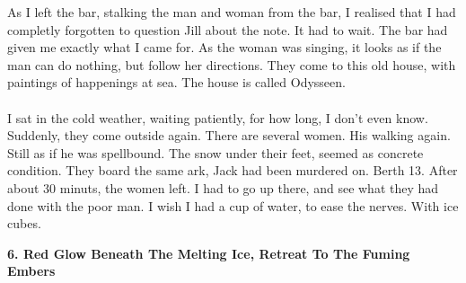 \documentclass[]{article}
\begin{document}
	As I left the bar, stalking the man and woman from the bar, I realised that I had completly forgotten to question Jill about the note. It had to wait. The bar had given me exactly what I came for. As the woman was singing, it looks as if the man can do nothing, but follow her directions. They come to this old house, with paintings of happenings at sea. The house is called Odysseen.
	\\ \\
	I sat in the cold weather, waiting patiently, for how long, I don't even know. Suddenly, they come outside again. There are several women. His walking again. Still as if he was spellbound. The snow under their feet, seemed as concrete condition. They board the same ark, Jack had been murdered on. Berth 13. After about 30 minuts, the women left. I had to go up there, and see what they had done with the poor man. I wish I had a cup of water, to ease the nerves. With ice cubes.
	
	\newpage
	
	\begin{center}
		\large\textbf{6. Red Glow Beneath The Melting Ice, \newline Retreat To The Fuming Embers}
	\end{center}
	
\end{document}
